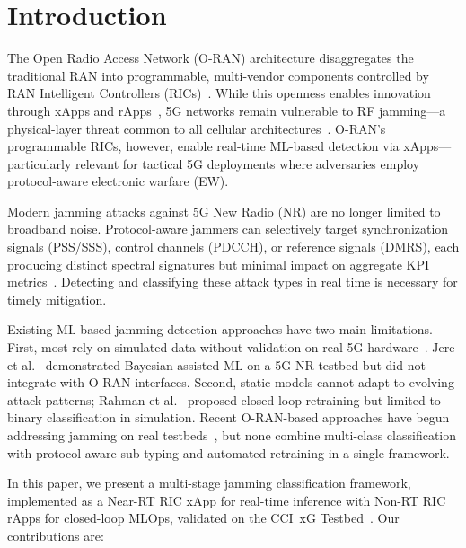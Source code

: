 \documentclass[conference]{IEEEtran}
\begin{document}
\section{Introduction}
\label{sec:intro}

The Open Radio Access Network (O-RAN) architecture disaggregates the traditional RAN into programmable, multi-vendor components controlled by RAN Intelligent Controllers (RICs)~\cite{polese2023, abdalla2022}. While this openness enables innovation through xApps and rApps~\cite{santos2025, hoffmann2024}, 5G networks remain vulnerable to RF jamming---a physical-layer threat common to all cellular architectures~\cite{pirayesh2022, harvanek2024}. O-RAN's programmable RICs, however, enable real-time ML-based detection via xApps---particularly relevant for tactical 5G deployments where adversaries employ protocol-aware electronic warfare (EW).

Modern jamming attacks against 5G New Radio (NR) are no longer limited to broadband noise. Protocol-aware jammers can selectively target synchronization signals (PSS/SSS), control channels (PDCCH), or reference signals (DMRS), each producing distinct spectral signatures but minimal impact on aggregate KPI metrics~\cite{savadatti2024, shahid2024}. Detecting and classifying these attack types in real time is necessary for timely mitigation.

Existing ML-based jamming detection approaches have two main limitations. First, most rely on simulated data without validation on real 5G hardware~\cite{hachimi2020, kryszkiewicz2023}. Jere et al.~\cite{jere2024} demonstrated Bayesian-assisted ML on a 5G NR testbed but did not integrate with O-RAN interfaces. Second, static models cannot adapt to evolving attack patterns; Rahman et al.~\cite{rahman2025} proposed closed-loop retraining but limited to binary classification in simulation. Recent O-RAN-based approaches have begun addressing jamming on real testbeds~\cite{moore2025, bogucka2025, pazperez2025}, but none combine multi-class classification with protocol-aware sub-typing and automated retraining in a single framework.

In this paper, we present a multi-stage jamming classification framework, implemented as a Near-RT RIC xApp for real-time inference with Non-RT RIC rApps for closed-loop MLOps, validated on the CCI~xG Testbed~\cite{dasilva2025}. Our contributions are:
\end{document}
